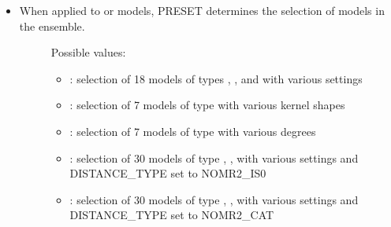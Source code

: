 \documentclass[letterpaper,10pt,english]{sphinxmanual}
\begin{document}
\begin{itemize}
\item {} \begin{description}
\item[{When applied to {\hyperref[\detokenize{SgteLib:ensemble}]{}} or {\hyperref[\detokenize{SgteLib:ensemble-stat}]{}} models, PRESET determines the selection of models in the ensemble.}] \leavevmode
\sphinxAtStartPar
Possible values:
\begin{itemize}
\item {} 
\sphinxAtStartPar
{}: selection of 18 models of types {\hyperref[\detokenize{SgteLib:prs}]{}}, {\hyperref[\detokenize{SgteLib:ks}]{}}, {\hyperref[\detokenize{SgteLib:rbf}]{}} and {\hyperref[\detokenize{SgteLib:cn}]{}} with various settings

\item {} 
\sphinxAtStartPar
{}: selection of 7 models of type {\hyperref[\detokenize{SgteLib:ks}]{}} with various kernel shapes

\item {} 
\sphinxAtStartPar
{}: selection of 7 models of type {\hyperref[\detokenize{SgteLib:prs}]{}} with various degrees

\item {} 
\sphinxAtStartPar
{}: selection of 30 models of type {\hyperref[\detokenize{SgteLib:prs-edge}]{}}, {\hyperref[\detokenize{SgteLib:ks}]{}}, {\hyperref[\detokenize{SgteLib:rbf}]{}} with various settings and DISTANCE\_TYPE set to NOMR2\_IS0

\item {} 
\sphinxAtStartPar
{}: selection of 30 models of type {\hyperref[\detokenize{SgteLib:prs-edge}]{}}, {\hyperref[\detokenize{SgteLib:ks}]{}}, {\hyperref[\detokenize{SgteLib:rbf}]{}} with various settings and DISTANCE\_TYPE set to NOMR2\_CAT


\end{itemize}
\end{description}
\end{itemize}
\end{document}
